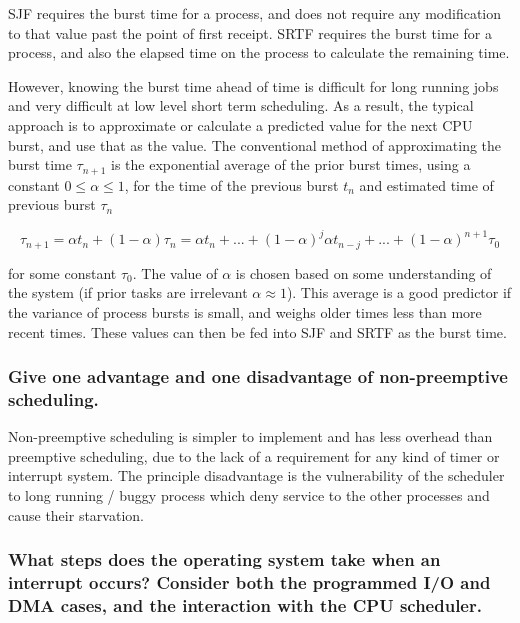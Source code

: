 \documentclass[]{article}
\begin{document}
        SJF requires the burst time for a process, and does not require any modification to that value past the point of first receipt.
        SRTF requires the burst time for a process, and also the elapsed time on the process to calculate the remaining time.

        However, knowing the burst time ahead of time is difficult for long running jobs and very difficult at low level short term scheduling. As a result, the typical approach is to approximate or calculate a predicted value for the next CPU burst, and use that as the value. The conventional method of approximating the burst time $\tau_{n+1}$ is the exponential average of the prior burst times, using a constant $0\leq\alpha\leq 1$, for the time of the previous burst $t_{n}$ and estimated time of previous burst $\tau_{n}$

        \begin{equation}
            \tau_{n+1} = \alpha t_{n} + (1 - \alpha)\tau_{n}
                       = \alpha t_{n} + ... + (1 - \alpha)^{j}\alpha t_{n-j} + ... + (1 - \alpha)^{n + 1}\tau_{0}
        \end{equation}

        for some constant $\tau_{0}$. The value of $\alpha$ is chosen based on some understanding of the system (if prior tasks are irrelevant $\alpha\approx 1$). This average is a good predictor if the variance of process bursts is small, and weighs older times less than more recent times. These values can then be fed into SJF and SRTF as the burst time.

        \subsubsection{Give one advantage and one disadvantage of non-preemptive scheduling.}

        Non-preemptive scheduling is simpler to implement and has less overhead than preemptive scheduling, due to the lack of a requirement for any kind of timer or interrupt system. The principle disadvantage is the vulnerability of the scheduler to long running / buggy process which deny service to the other processes and cause their starvation.

        \subsubsection{What steps does the operating system take when an interrupt occurs? Consider both the programmed I/O and DMA cases, and the interaction with the CPU scheduler.}
        \label{DMA}
\end{document}

